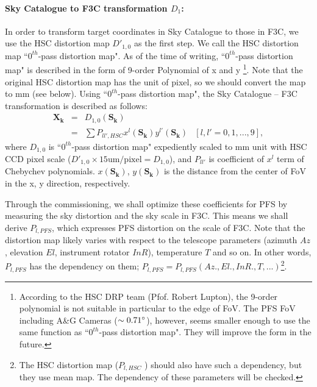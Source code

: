\paragraph{Sky Catalogue to F3C transformation $D_1$:}
In order to transform target coordinates in Sky Catalogue to those in F3C, we use the HSC distortion map $D'_{1,0}$ as the first step.
We call the HSC distortion map ``$0^{th}$-pass distortion map".
As of the time of writing, ``$0^{th}$-pass distortion map" is described in the form of 9-order Polynomial of x and y \footnote{According to the HSC DRP team (Pfof. Robert Lupton), the 9-order polynomial is not suitable in particular to the edge of FoV. The PFS FoV including A\&G Cameras ($\sim 0.71 ^\circ$), however, seems smaller enough to use the same function as ``$0^{th}$-pass distortion map". They will improve the form in the future.}.
Note that the original HSC distortion map has the unit of pixel, so we should convert the map to mm (see below).
Using ``$0^{th}$-pass distortion map", the Sky Catalogue -- F3C transformation is described as follows:
\begin{equation}
\begin{array}{cclc}
\bm{X_k} & = & D_{1,0} (\bm{S_k}) \\
& = & \sum P_{ll',HSC} x^l (\bm{S_k})y^{l'} (\bm{S_k}) & [l, l'=0,1,...,9],
\end{array}
\end{equation}
where $D_{1,0}$ is ``$0^{th}$-pass distortion map" expediently scaled to mm unit with HSC CCD pixel scale ($D'_{1,0} \times \mathrm{15 um/pixel} = D_{1,0}$), and $P_{ll'}$ is coefficient of $x^l$ term of Chebychev polynomials.
$x(\bm{S_k})$, $y(\bm{S_k})$ is the distance from the center of FoV in the x, y direction, respectively.

Through the commissioning, we shall optimize these coefficients for PFS by measuring the sky distortion and the sky scale in F3C.
This means we shall derive $P_{l,PFS}$, which expresses PFS distortion on the scale of F3C.
Note that the distortion map likely varies with respect to the telescope parameters (azimuth $Az$, elevation $El$, instrument rotator $InR$), temperature $T$ and so on.
In other words, $P_{l,PFS}$ has the dependency on them; $P_{l,PFS}=P_{l,PFS}(Az., El., InR., T, ...)$\footnote{The HSC distortion map ($P_{l,HSC}$ ) should also have such a dependency, but they use mean map. The dependency of these parameters will be checked.}.

